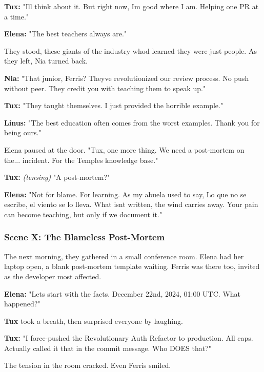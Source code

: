 \textbf{Tux:} "I\textquotesingle ll think about it. But right now, I\textquotesingle m good where I am. Helping one PR at a time."

\textbf{Elena:} "The best teachers always are."

They stood, these giants of the industry who\textquotesingle d learned they were just people. As they left, Nia turned back.

\textbf{Nia:} "That junior, Ferris? They\textquotesingle ve revolutionized our review process. \textquotesingle No push without peer.\textquotesingle{} They credit you with teaching them to speak up."

\textbf{Tux:} "They taught themselves. I just provided the horrible example."

\textbf{Linus:} "The best education often comes from the worst examples. Thank you for being ours."

Elena paused at the door. "Tux, one more thing. We need a post-mortem on the... incident. For the Temple\textquotesingle s knowledge base."

\textbf{Tux:} \emph{(tensing)} "A post-mortem?"

\textbf{Elena:} "Not for blame. For learning. As my abuela used to say, \textquotesingle Lo que no se escribe, el viento se lo lleva.\textquotesingle{} What isn\textquotesingle t written, the wind carries away. Your pain can become teaching, but only if we document it."

\bookdivider

\subsubsection{Scene X: The Blameless Post-Mortem}\label{scene-x-the-blameless-post-mortem}

The next morning, they gathered in a small conference room. Elena had her laptop open, a blank post-mortem template waiting. Ferris was there too, invited as the developer most affected.

\textbf{Elena:} "Let\textquotesingle s start with the facts. December 22nd, 2024, 01:00 UTC. What happened?"

\textbf{Tux} took a breath, then surprised everyone by laughing.

\textbf{Tux:} "I force-pushed the \textquotesingle Revolutionary Auth Refactor\textquotesingle{} to production. All caps. Actually called it that in the commit message. Who DOES that?"

The tension in the room cracked. Even Ferris smiled.

